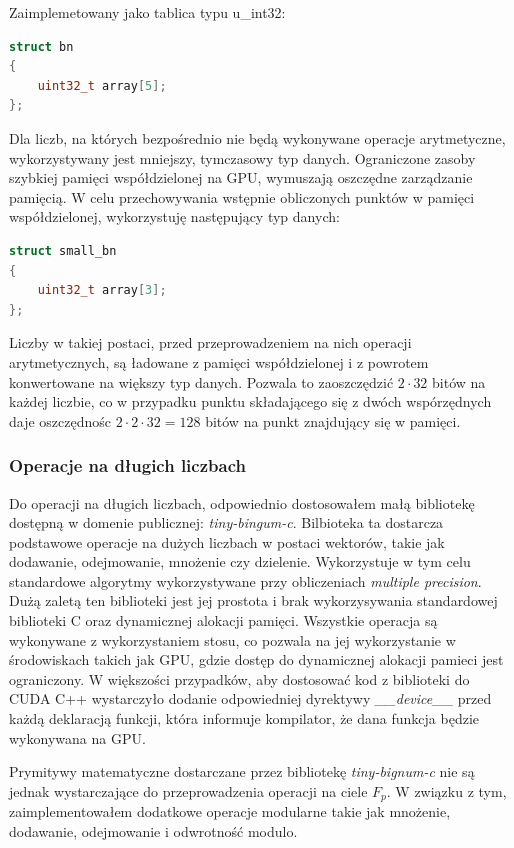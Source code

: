 Zaimplemetowany jako tablica typu u\_int32:
\begin{lstlisting}[language=C++]
struct bn
{
    uint32_t array[5];
};
\end{lstlisting}
Dla liczb, na których bezpośrednio nie będą wykonywane operacje arytmetyczne, wykorzystywany jest mniejszy, tymczasowy typ
danych.
Ograniczone zasoby szybkiej pamięci współdzielonej na GPU, wymuszają oszczędne zarządzanie pamięcią. W celu
przechowywania wstępnie obliczonych punktów w pamięci współdzielonej, wykorzystuję następujący typ danych:
\begin{lstlisting}[language=C++]
struct small_bn
{
    uint32_t array[3];
};
\end{lstlisting}
\par
Liczby w takiej postaci, przed przeprowadzeniem na nich operacji arytmetycznych, są ładowane z pamięci współdzielonej i z powrotem konwertowane na większy typ danych.
Pozwala to zaoszczędzić $ 2 \cdot 32$ bitów na każdej liczbie, co w przypadku punktu składającego się z dwóch wspórzędnych
daje oszczędnośc $2 \cdot 2 \cdot 32 = 128$ bitów na punkt znajdujący się w pamięci.

\subsubsection{Operacje na długich liczbach}
Do operacji na długich liczbach, odpowiednio dostosowałem małą bibliotekę
dostępną w domenie publicznej: \textit{tiny-bingum-c}.
Bilbioteka ta dostarcza podstawowe operacje na dużych liczbach w postaci wektorów, takie jak dodawanie, odejmowanie, mnożenie czy dzielenie.
Wykorzystuje w tym celu standardowe algorytmy \cite{Menezes2001} wykorzystywane przy obliczeniach \textit{multiple precision}.
Dużą zaletą ten biblioteki jest jej prostota i brak wykorzysywania standardowej biblioteki C oraz dynamicznej alokacji pamięci.
Wszystkie operacja są wykonywane z wykorzystaniem stosu,
co pozwala na jej wykorzystanie w środowiskach takich jak GPU, gdzie dostęp do dynamicznej alokacji pamieci jest ograniczony.
W większości przypadków, aby dostosować kod z biblioteki do CUDA C++ wystarczyło dodanie
odpowiedniej dyrektywy \textit{\_\_device\_\_} przed każdą deklaracją funkcji, która informuje kompilator, że dana funkcja
będzie wykonywana na GPU.
\par
Prymitywy matematyczne dostarczane przez bibliotekę \textit{tiny-bignum-c} nie są jednak wystarczające do przeprowadzenia
operacji na ciele $F_{p}$.
W związku z tym, zaimplementowałem dodatkowe operacje modularne takie jak mnożenie, dodawanie, odejmowanie i odwrotność modulo.


